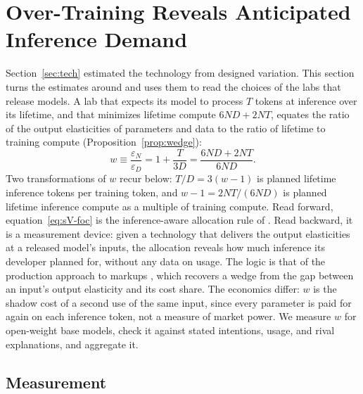 \section{Over-Training Reveals Anticipated Inference Demand}\label{sec:wedge}

Section~\ref{sec:tech} estimated the technology from designed variation. This section turns the estimates around and
uses them to read the choices of the labs that release models. A lab that expects its model to process $T$ tokens at inference over its lifetime, and that minimizes lifetime compute
$6ND+2NT$, equates the ratio of the output elasticities of parameters and data to the ratio of lifetime to training
compute (Proposition~\ref{prop:wedge}):
\begin{equation}\label{eq:sV-foc}
w\equiv\frac{\varepsilon_N}{\varepsilon_D}=1+\frac{T}{3D}=\frac{6ND+2NT}{6ND}.
\end{equation}
Two transformations of $w$ recur below: $T/D=3(w-1)$ is planned lifetime inference tokens per training token, and
$w-1=2NT/(6ND)$ is planned lifetime inference compute as a multiple of training compute. Read forward,
equation~\eqref{eq:sV-foc} is the inference-aware allocation rule of \citet{sardana2024beyond}. Read backward, it is a
measurement device: given a technology that delivers the output elasticities at a released model's inputs, the
allocation reveals how much inference its developer planned for, without any data on usage. The logic is that of the
production approach to markups \citep{deloecker2012markups}, which recovers a wedge from the gap between an input's
output elasticity and its cost share. The economics differ: $w$ is the shadow cost of a second use of the same input,
since every parameter is paid for again on each inference token, not a measure of market power. We measure $w$ for
open-weight base models, check it against stated intentions, usage, and rival explanations, and aggregate it.

\subsection{Measurement}\label{sec:wedge-measure}

